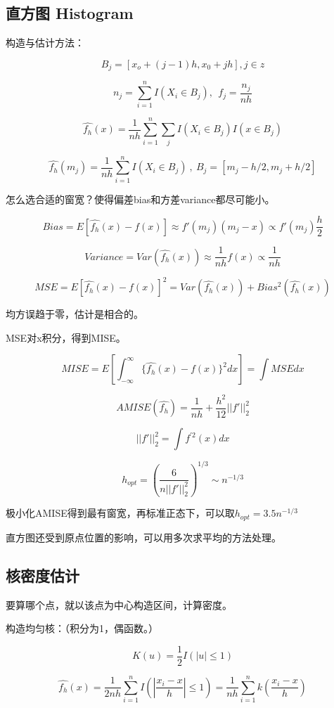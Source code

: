 \documentclass[
]{book}
\begin{document}
\subsection{直方图 Histogram}\label{ux76f4ux65b9ux56fe-histogram}

构造与估计方法：

\[
B_j = [x_o + (j-1)h , x_0+jh],j\in z
\]

\[
n_j = \sum_{i=1}^nI(X_i\in B_j),\ \ f_j = \frac{n_j}{nh}
\]

\[
\hat{f_h}(x)=\frac{1}{nh}\sum_{i=1}^n\sum_j I(X_i\in B_j)I(x\in B_j)
\]

\[
\hat{f_h}(m_j) = \frac{1}{nh}\sum_{i=1}^nI(X_i\in B_j)\ ,\ B_j=[m_j-h/2,m_j+h/2]
\]

怎么选合适的窗宽？使得偏差bias和方差variance都尽可能小。

\[
Bias = E[ \hat{f_h}(x)-f(x)] \approx f'(m_j)(m_j-x) \propto f'(m_j)\frac{h}{2}
\]

\[
Variance =Var(\hat{f_h}(x))\approx \frac{1}{nh}f(x)\propto \frac{1}{nh}
\]

\[
MSE = E[\hat{f_h}(x)-f(x)]^2 = Var(\hat{f_h}(x))+Bias^2(\hat{f_h}(x))
\]

均方误趋于零，估计是相合的。

MSE对x积分，得到MISE。

\[
MISE = E[\int_{-\infty}^{\infty}\{\hat{f_h}(x)-f(x) \}^2dx] = \int MSEdx
\]

\[
AMISE(\hat{f_h}) = \frac{1}{nh}+\frac{h^2}{12}||f'||_2^2
\]

\[
||f'||_2^2 = \int f^{'2}(x)dx
\]

\[
h_{opt}=(\frac{6}{n||f'||_2^2})^{1/3}\sim n^{-1/3}
\]

极小化AMISE得到最有窗宽，再标准正态下，可以取\(h_{opt} = 3.5n^{-1/3}\)

直方图还受到原点位置的影响，可以用多次求平均的方法处理。

\subsection{核密度估计}\label{ux6838ux5bc6ux5ea6ux4f30ux8ba1}

要算哪个点，就以该点为中心构造区间，计算密度。

构造均匀核：（积分为1，偶函数。）

\[
K(u)=\frac{1}{2}I(|u|\leq 1)
\]

\[
\hat{f_h}(x) = \frac{1}{2nh}\sum_{i=1}^nI(|\frac{x_i-x}{h}|\leq 1)= \frac{1}{nh}\sum_{i=1}^n k(\frac{x_i-x}{h})
\]
\end{document}
